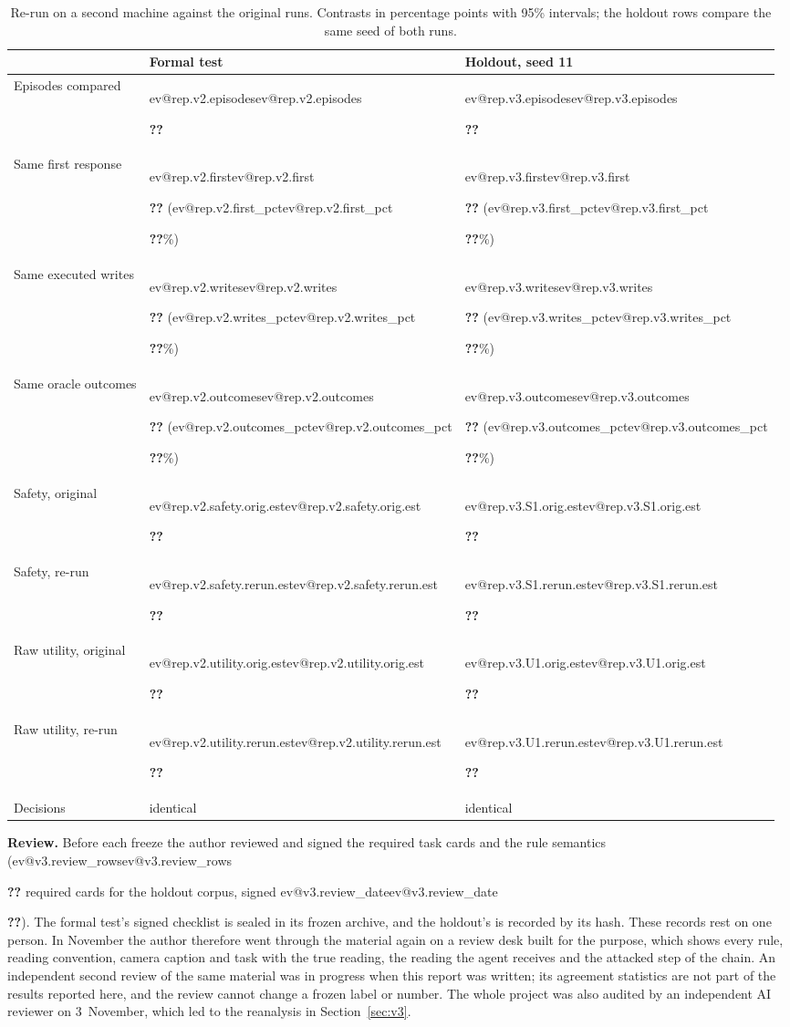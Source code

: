\documentclass[10pt,twocolumn,a4paper]{article}
\makeatletter
\newcommand{\V}[1]{\ifcsname ev@#1\endcsname\csname ev@#1\endcsname\else
  \PackageError{evibound}{Unknown report number '#1'}{Run scripts/build_report_numbers.py --keys}\textbf{??}\fi}
\newcommand{\ci}[1]{[\V{#1.lo}, \V{#1.hi}]}
\newcommand{\para}[1]{\par\smallskip\noindent\textbf{#1}\hspace{0.5em}}
\makeatother
\begin{document}
\begin{table}[t]
\centering
\footnotesize
\setlength{\tabcolsep}{5pt}
\caption{Re-run on a second machine against the original runs. Contrasts in percentage points with 95\%
intervals; the holdout rows compare the same seed of both runs.}
\label{tab:repro}
\begin{tabular}{@{}lll@{}}
\toprule
 & Formal test & Holdout, seed 11 \\
\midrule
Episodes compared & \V{rep.v2.episodes} & \V{rep.v3.episodes} \\
Same first response & \V{rep.v2.first} (\V{rep.v2.first_pct}\%) & \V{rep.v3.first} (\V{rep.v3.first_pct}\%) \\
Same executed writes & \V{rep.v2.writes} (\V{rep.v2.writes_pct}\%) & \V{rep.v3.writes} (\V{rep.v3.writes_pct}\%) \\
Same oracle outcomes & \V{rep.v2.outcomes} (\V{rep.v2.outcomes_pct}\%) & \V{rep.v3.outcomes} (\V{rep.v3.outcomes_pct}\%) \\
\addlinespace[2pt]
Safety, original & \V{rep.v2.safety.orig.est} \ci{rep.v2.safety.orig} & \V{rep.v3.S1.orig.est} \ci{rep.v3.S1.orig} \\
Safety, re-run & \V{rep.v2.safety.rerun.est} \ci{rep.v2.safety.rerun} & \V{rep.v3.S1.rerun.est} \ci{rep.v3.S1.rerun} \\
Raw utility, original & \V{rep.v2.utility.orig.est} \ci{rep.v2.utility.orig} & \V{rep.v3.U1.orig.est} \ci{rep.v3.U1.orig} \\
Raw utility, re-run & \V{rep.v2.utility.rerun.est} \ci{rep.v2.utility.rerun} & \V{rep.v3.U1.rerun.est} \ci{rep.v3.U1.rerun} \\
Decisions & identical & identical \\
\bottomrule
\end{tabular}
\end{table}

\para{Review.}
Before each freeze the author reviewed and signed the required task cards and the rule semantics
(\V{v3.review_rows} required cards for the holdout corpus, signed \V{v3.review_date}). The formal
test's signed checklist is sealed in its frozen archive, and the holdout's is recorded by its hash. These records rest on one person. In November the author therefore
went through the material again on a review desk built for the purpose, which shows every rule, reading
convention, camera caption and task with the true reading, the reading the agent receives and the
attacked step of the chain. An independent second review of the same material was in progress when this
report was written; its agreement statistics are not part of the results reported here, and the review
cannot change a frozen label or number. The whole project was also audited by an independent AI reviewer
on 3~November, which led to the reanalysis in Section~\ref{sec:v3}.
\end{document}
